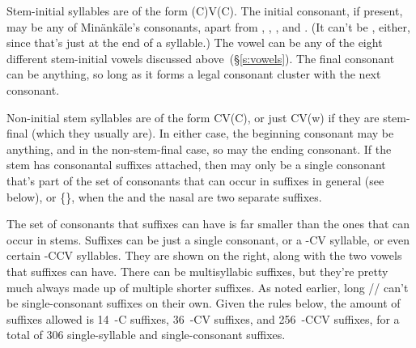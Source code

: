 Stem-initial syllables are of the form (C)V(C). The initial consonant, if
present, may be any of Min\"ank\"ale's consonants, apart from , ,
, and . (It can't be , either, since that's just  at
the end of a syllable.) The vowel can be any of the eight different stem-initial
vowels discussed above~(\S\ref{s:vowels}). The final consonant can be anything,
so long as it forms a legal consonant cluster with the next consonant.

Non-initial stem syllables are of the form CV(C), or just CV(w) if they are
stem-final (which they usually are). In either case, the beginning consonant may
be anything, and in the non-stem-final case, so may the ending consonant. If the
stem has consonantal suffixes attached, then may only be a single consonant
that's part of the set of consonants that can occur in suffixes in general (see
below), or \{\}, when the  and the nasal are two
separate suffixes.

The set of consonants that suffixes can have
is far smaller than the ones that can occur in stems. Suffixes can be just a
single consonant, or a -CV syllable, or even certain -CCV syllables. They are
shown on the right, along with the two vowels that suffixes can have. There can
be multisyllabic suffixes, but they're pretty much always made up of multiple
shorter suffixes. As noted earlier, long \mbox{//} can't be
single-consonant suffixes on their own. Given the rules below, the amount of
suffixes allowed is 14~-C suffixes, 36~-CV suffixes, and 256~-CCV suffixes, for
a total of 306 single-syllable and single-consonant suffixes.

